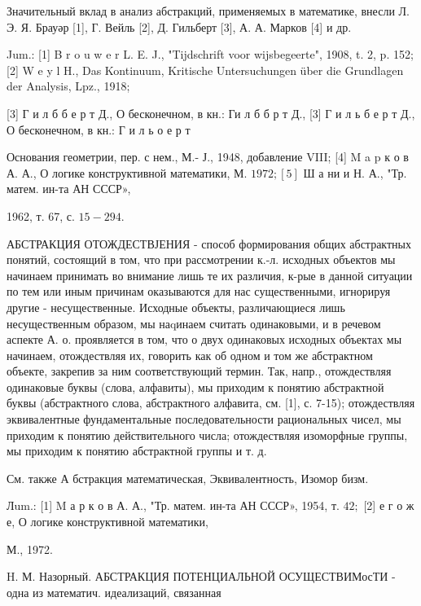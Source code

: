 \documentclass[10pt]{article}
\begin{document}
Значительный вклад в анализ абстракций, применяемых в математике, внесли Л. Э. Я. Брауәр [1], Г. Вейль [2], Д. Гильберт [3], А. А. Марков [4] и др.



Jum.: [1] B r o u w e r L. E. J., "Tijdschrift voor wijsbegeerte", 1908, t. 2, p. 152; [2] W e y l H., Das Kontinuum, Kritische Untersuchungen über die Grundlagen der Analysis, Lpz., 1918;

[3] Г и л б б е р т Д., О бесконечном, в кн.: Ги л б б р т Д., [3] Г и л ь б е р т Д., О бесконечном, в кн.: Г и л ь о е р т

Основания геометрии, пер. с нем., М.- Ј., 1948, добавление VIII; [4] M a p к о в А. А., О логике конструктивной математики, М. $1972 ;[5]$ Ш а ни и Н. А., "Тр. матем. ин-та АН СССР»,

1962, т. 67, с. $15-294$.



АБСТРАКЦИЯ ОТОЖДЕСТВЈЕНИЯ - способ формирования общих абстрактных понятий, состоящий в том, что при рассмотрении к.-л. исходных объектов мы начинаем принимать во внимание лишь те их различия, к-рые в данной ситуации по тем или иным причинам оказываются для нас существенными, игнорируя другие - несущественные. Исходные объекты, различающиеся лишь несущественным образом, мы наqинаем считать одинаковыми, и в речевом аспекте А. о. проявляется в том, что о двух одинаковых исходных объектах мы начинаем, отождествляя их, говорить как об одном и том же абстрактном объекте, закрепив за ним соответствующий термин. Так, напр., отождествляя одинаковые буквы (слова, алфавиты), мы приходим к понятию абстрактной буквы (абстрактного слова, абстрактного алфавита, см. [1], с. 7-15); отождествляя эквивалентные фундаментальные последовательности рациональных чисел, мы приходим к понятию действительного числа; отождествляя изоморфные группы, мы приходим к понятию абстрактной группы и т. д.



См. также А бстракция математическая, Эквивалентность, Изомор бизм.



Лum.: [1] M а р к о в А. А., "Тр. матем. ин-та АН СССР», 1954, т. $42 ;$ [2] е г о ж е, О логике конструктивной математики,

М., 1972.

H. М. Назорный. АБСТРАКЦИЯ ПОТЕНЦИАЛЬНОЙ ОСУЩЕСТВИМосТИ - одна из математич. идеализаций, связанная
\end{document}
